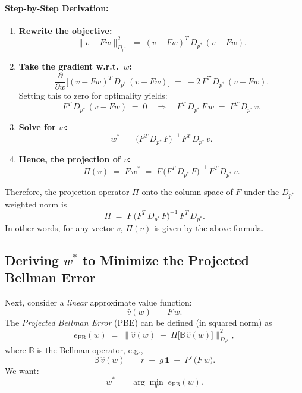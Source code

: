 \paragraph{Step-by-Step Derivation:}

\begin{enumerate}
    \item \textbf{Rewrite the objective:}
    \[
    \|v - Fw\|_{D_{p^*}}^2 
    \;=\; (v - Fw)^T\,D_{p^*}\,(v - Fw).
    \]
    
    \item \textbf{Take the gradient w.r.t.\ $w$:}
    \[
    \frac{\partial}{\partial w} 
    \bigl[(v - Fw)^T\,D_{p^*}\,(v - Fw)\bigr]
    \;=\;
    -2\,F^T\,D_{p^*}\,(v - Fw).
    \]
    Setting this to zero for optimality yields:
    \[
    F^T\,D_{p^*}\,(v - Fw) \;=\; 0 
    \quad\Longrightarrow\quad
    F^T\,D_{p^*}\,F\,w \;=\; F^T\,D_{p^*}\,v.
    \]
    
    \item \textbf{Solve for $w$:}
    \[
    w^* 
    \;=\; \bigl(F^T\,D_{p^*}\,F\bigr)^{-1}\,F^T\,D_{p^*}\,v.
    \]
    
    \item \textbf{Hence, the projection of $v$:}
    \[
    \Pi(v)
    \;=\; F\,w^*
    \;=\; F\,\bigl(F^T\,D_{p^*}\,F\bigr)^{-1}\,F^T\,D_{p^*}\,v.
    \]
\end{enumerate}

Therefore, the projection operator $\Pi$ onto the column space of $F$ under the $D_{p^*}$-weighted norm is
\[
\boxed{
\Pi 
\;=\; 
F\,\bigl(F^T\,D_{p^*}\,F\bigr)^{-1}\,F^T\,D_{p^*}.
}
\]
In other words, for any vector $v$, $\Pi(v)$ is given by the above formula.

\subsection{Deriving \texorpdfstring{$w^*$}{w*} to Minimize the Projected Bellman Error}

Next, consider a \emph{linear} approximate value function:
\[
\hat{v}(w) \;=\; F\,w.
\]
The \emph{Projected Bellman Error} (PBE) can be defined (in squared norm) as
\[
e_{\mathrm{PB}}(w)
\;=\;
\bigl\|
\hat{v}(w) 
\;-\;
\Pi\bigl[\mathbb{B}\,\hat{v}(w)\bigr]
\bigr\|_{D_{p^*}}^2,
\]
where $\mathbb{B}$ is the Bellman operator, e.g.,
\[
\mathbb{B}\,\hat{v}(w)
\;=\;
r \;-\; g\,\mathbf{1}
\;+\;
P'\,\bigl(F\,w\bigr).
\]
We want:
\[
w^*
\;=\;
\arg\min_{w}
\;e_{\mathrm{PB}}(w).
\]

